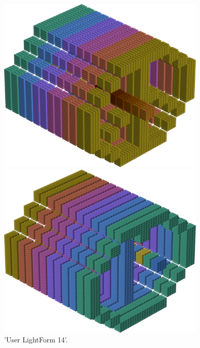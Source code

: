 \begin{minipage}[b]{0.48\linewidth}
\begin{figure}[H]
    \centering
    \begin{adjustbox}{width=4cm,margin=0cm 0cm}
      \includegraphics[width=10cm]{src/colorspace_patterns/pattern22-45.png}%
    \end{adjustbox}
    \begin{adjustbox}{width=4cm,margin=0cm 0cm}
      \includegraphics[width=10cm]{src/colorspace_patterns/pattern22-225.png}%
    \end{adjustbox}
\caption{'User LightForm 14'.}
\end{figure}
\end{minipage}

